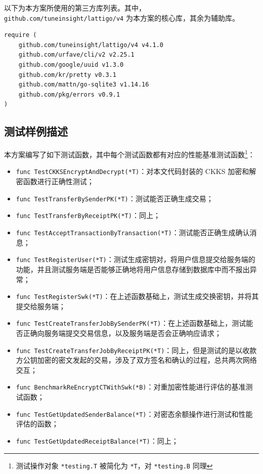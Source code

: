 以下为本方案所使用的第三方库列表。其中，\verb|github.com/tuneinsight/lattigo/v4| 为本方案的核心库，其余为辅助库。

\begin{verbatim}
require (
    github.com/tuneinsight/lattigo/v4 v4.1.0
    github.com/urfave/cli/v2 v2.25.1
    github.com/google/uuid v1.3.0
    github.com/kr/pretty v0.3.1
    github.com/mattn/go-sqlite3 v1.14.16
    github.com/pkg/errors v0.9.1
)
\end{verbatim}

\subsection{测试样例描述}

本方案编写了如下测试函数，其中每个测试函数都有对应的性能基准测试函数\footnote{测试操作对象 \texttt{*testing.T} 被简化为 \texttt{*T}，对 \texttt{*testing.B} 同理}：

\begin{itemize}
    \item \verb|func TestCKKSEncryptAndDecrypt(*T)|：对本文代码封装的 CKKS 加密和解密函数进行正确性测试；
    \item \verb|func TestTransferBySenderPK(*T)|：测试能否正确生成交易；
    \item \verb|func TestTransferByReceiptPK(*T)|：同上；
    \item \verb|func TestAcceptTransactionByTransaction(*T)|：测试能否正确生成确认消息；
    \item \verb|func TestRegisterUser(*T)|：测试生成密钥对，将用户信息提交给服务端的功能，并且测试服务端是否能够正确地将用户信息存储到数据库中而不报出异常；
    \item \verb|func TestRegisterSwk(*T)|：在上述函数基础上，测试生成交换密钥，并将其提交给服务端；
    \item \verb|func TestCreateTransferJobBySenderPK(*T)|：在上述函数基础上，测试能否正确向服务端提交交易信息，以及服务端是否会正确响应请求；
    \item \verb|func TestCreateTransferJobByReceiptPK(*T)|：同上，但是测试的是以收款方公钥加密的密文发起的交易，涉及了双方签名和确认的过程，总共两次网络交互；
    \item \verb|func BenchmarkReEncryptCTWithSwk(*B)|：对重加密性能进行评估的基准测试函数；
    \item \verb|func TestGetUpdatedSenderBalance(*T)|：对密态余额操作进行测试和性能评估的函数；
    \item \verb|func TestGetUpdatedReceiptBalance(*T)|：同上；
\end{itemize}

